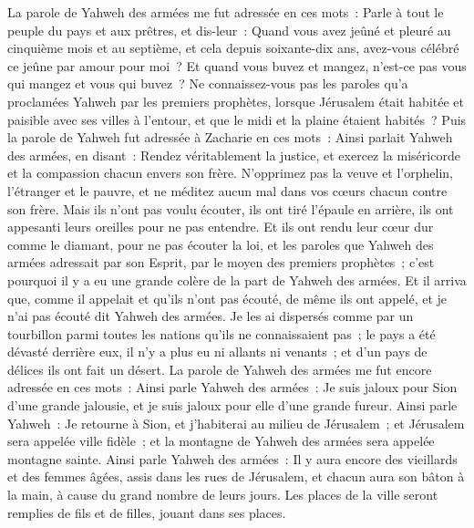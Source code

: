 \begin{multicols}{2}
La parole de Yahweh des armées me fut adressée en ces mots~:
Parle à tout le peuple du pays et aux prêtres, et dis-leur~: Quand vous avez jeûné et pleuré au cinquième mois et au septième, et cela depuis soixante-dix ans, avez-vous célébré ce jeûne par amour pour moi~?
Et quand vous buvez et mangez, n'est-ce pas vous qui mangez et vous qui buvez~?
Ne connaissez-vous pas les paroles qu'a proclamées Yahweh par les premiers prophètes, lorsque Jérusalem était habitée et paisible avec ses villes à l'entour, et que le midi et la plaine étaient habités~?
Puis la parole de Yahweh fut adressée à Zacharie en ces mots~:
Ainsi parlait Yahweh des armées, en disant~: Rendez véritablement la justice, et exercez la miséricorde et la compassion chacun envers son frère.
N'opprimez pas la veuve et l'orphelin, l'étranger et le pauvre, et ne méditez aucun mal dans vos cœurs chacun contre son frère.
Mais ils n'ont pas voulu écouter, ils ont tiré l'épaule en arrière, ils ont appesanti leurs oreilles pour ne pas entendre.
Et ils ont rendu leur cœur dur comme le diamant, pour ne pas écouter la loi, et les paroles que Yahweh des armées adressait par son Esprit, par le moyen des premiers prophètes~; c'est pourquoi il y a eu une grande colère de la part de Yahweh des armées.
Et il arriva que, comme il appelait et qu'ils n'ont pas écouté, de même ils ont appelé, et je n'ai pas écouté dit Yahweh des armées.
Je les ai dispersés comme par un tourbillon parmi toutes les nations qu'ils ne connaissaient pas~; le pays a été dévasté derrière eux, il n'y a plus eu ni allants ni venants~; et d'un pays de délices ils ont fait un désert.
\VerseOne{}La parole de Yahweh des armées me fut encore adressée en ces mots~:
Ainsi parle Yahweh des armées~: Je suis jaloux pour Sion d'une grande jalousie, et je suis jaloux pour elle d'une grande fureur.
Ainsi parle Yahweh~: Je retourne à Sion, et j'habiterai au milieu de Jérusalem~; et Jérusalem sera appelée ville fidèle~; et la montagne de Yahweh des armées sera appelée montagne sainte.
Ainsi parle Yahweh des armées~: Il y aura encore des vieillards et des femmes âgées, assis dans les rues de Jérusalem, et chacun aura son bâton à la main, à cause du grand nombre de leurs jours.
Les places de la ville seront remplies de fils et de filles, jouant dans ses places.

\end{multicols}
